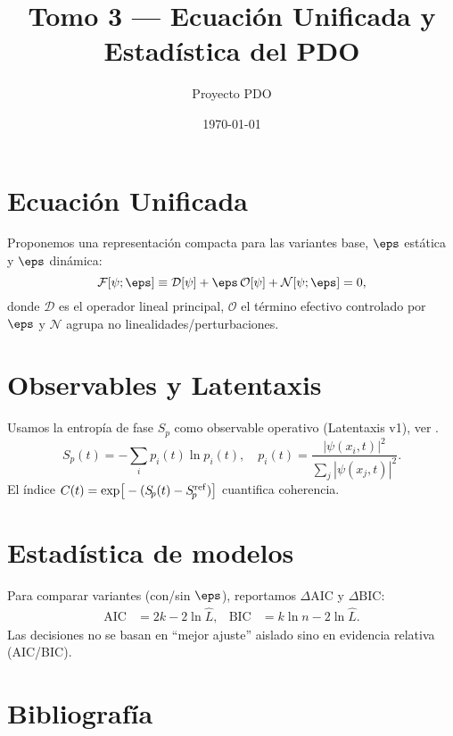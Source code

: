 \documentclass[11pt]{article}
\title{Tomo 3 — Ecuación Unificada y Estadística del PDO}
\author{Proyecto PDO}
\date{\today}
\begin{document}
\maketitle
\tableofcontents

\section{Ecuación Unificada}\label{sec:unificada}
Proponemos una representación compacta para las variantes base, \(\eps\) estática y \(\eps\) dinámica:
\begin{equation}
 \mathcal{F}[\psi;\eps] \equiv \mathcal{D}[\psi] + \eps\,\mathcal{O}[\psi] + \mathcal{N}[\psi;\eps] = 0,
 \label{eq:ecuacion-unificada}
\end{equation}
 donde \(\mathcal{D}\) es el operador lineal principal, \(\mathcal{O}\) el término efectivo controlado por \(\eps\) y \(\mathcal{N}\) agrupa no linealidades/perturbaciones.

\section{Observables y Latentaxis}\label{sec:obs}
Usamos la entropía de fase \(S_{\!p}\) como observable operativo (Latentaxis v1), ver .
\begin{equation}
 S_{\!p}(t) = -\sum_i p_i(t)\ln p_i(t), \quad p_i(t)=\frac{|\psi(x_i,t)|^2}{\sum_j |\psi(x_j,t)|^2}.
 \label{eq:Sp}
\end{equation}
El índice \(C(t)=\exp\!\big[-(S_{\!p}(t)-S_{\!p}^{\rm ref})\big]\) cuantifica coherencia.

\section{Estadística de modelos}\label{sec:stat}
Para comparar variantes (con/sin \(\eps\)), reportamos \(\Delta \mathrm{AIC}\) y \(\Delta \mathrm{BIC}\):
\begin{align}
 \mathrm{AIC} &= 2k - 2\ln\hat{L}, &
 \mathrm{BIC} &= k\ln n - 2\ln\hat{L}.
\end{align}
Las decisiones no se basan en “mejor ajuste” aislado sino en evidencia relativa (AIC/BIC).

\section{Bibliografía}
\printbibliography
\end{document}
